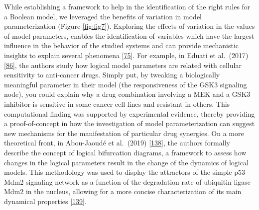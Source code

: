 \documentclass[
  12pt,
]{book}
\begin{document}
While establishing a framework to help in the identification of the right rules for a Boolean model, we leveraged the benefits of variation in model parameterization (Figure \ref{fig:fig7}).
Exploring the effects of variation in the values of model parameters, enables the identification of variables which have the largest influence in the behavior of the studied systems and can provide mechanistic insights to explain several phenomena {[}\protect\hyperlink{ref-Aldridge2006}{75}{]}.
For example, in Eduati et al.~(2017) {[}\protect\hyperlink{ref-Eduati2017}{86}{]}, the authors study how logical model parameters are related with cellular sensitivity to anti-cancer drugs.
Simply put, by tweaking a biologically meaningful parameter in their model (the responsiveness of the GSK3 signaling node), you could explain why a drug combination involving a MEK and a GSK3 inhibitor is sensitive in some cancer cell lines and resistant in others.
This computational finding was supported by experimental evidence, thereby providing a proof-of-concept in how the investigation of model parameterization can suggest new mechanisms for the manifestation of particular drug synergies.
On a more theoretical front, in Abou-Jaoudé et al.~(2019) {[}\protect\hyperlink{ref-Abou-Jaoude2019}{138}{]}, the authors formally describe the concept of logical bifurcation diagrams, a framework to assess how changes in the logical parameters result in the change of the dynamics of logical models.
This methodology was used to display the attractors of the simple p53-Mdm2 signaling network as a function of the degradation rate of ubiquitin ligase Mdm2 in the nucleus, allowing for a more concise characterization of its main dynamical properties {[}\protect\hyperlink{ref-Abou-Jaoude2009}{139}{]}.
\end{document}
